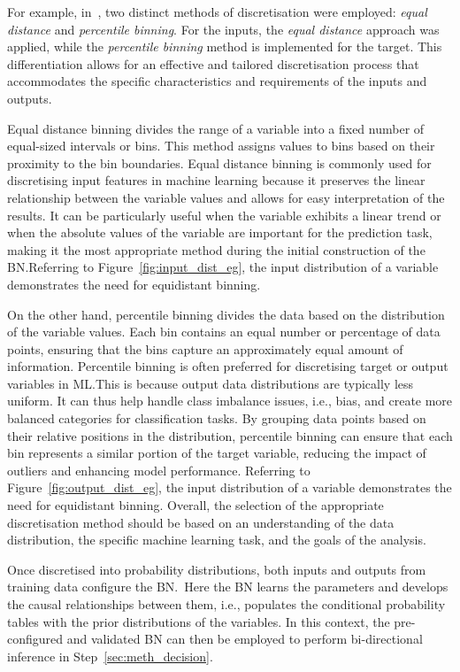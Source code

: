 \documentclass[journal]{IEEEtran}
\begin{document}
For example, in~\cite{Griffiths2024}, two distinct methods of discretisation were employed: \textit{equal distance} and \textit{percentile binning}. For the inputs, the \textit{equal distance} approach was applied, while the \textit{percentile binning} method is implemented for the target. This differentiation allows for an effective and tailored discretisation process that accommodates the specific characteristics and requirements of the inputs and outputs.

Equal distance binning divides the range of a variable into a fixed number of equal-sized intervals or bins\@. This method assigns values to bins based on their proximity to the bin boundaries. Equal distance binning is commonly used for discretising input features in machine learning because it preserves the linear relationship between the variable values and allows for easy interpretation of the results. It can be particularly useful when the variable exhibits a linear trend or when the absolute values of the variable are important for the prediction task, making it the most appropriate method during the initial construction of the BN.\@ Referring to Figure~\ref{fig:input_dist_eg}, the input distribution of a variable demonstrates the need for equidistant binning.

On the other hand, percentile binning divides the data based on the distribution of the variable values. Each bin contains an equal number or percentage of data points, ensuring that the bins capture an approximately equal amount of information. Percentile binning is often preferred for discretising target or output variables in ML.\@ This is because output data distributions are typically less uniform. It can thus help handle class imbalance issues, i.e., bias, and create more balanced categories for classification tasks. By grouping data points based on their relative positions in the distribution, percentile binning can ensure that each bin represents a similar portion of the target variable, reducing the impact of outliers and enhancing model performance. Referring to Figure~\ref{fig:output_dist_eg}, the input distribution of a variable demonstrates the need for equidistant binning.  Overall, the selection of the appropriate discretisation method should be based on an understanding of the data distribution, the specific machine learning task, and the goals of the analysis. 

Once discretised into probability distributions, both inputs and outputs from training data configure the BN.~Here the BN learns the parameters and develops the causal relationships between them, i.e., populates the conditional probability tables with the prior distributions of the variables. In this context, the pre-configured and validated BN can then be employed to perform bi-directional inference in Step~\ref{sec:meth_decision}.
\end{document}
